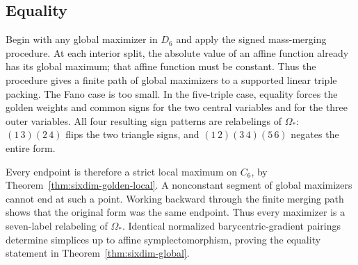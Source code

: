 \subsection{Equality}

Begin with any global maximizer in $D_6$ and apply the signed mass-merging
procedure. At each interior split, the absolute value of an affine function
already has its global maximum; that affine function must be constant.
Thus the procedure gives a finite path of global maximizers to a supported
linear triple packing. The Fano case is too small. In the five-triple case,
equality forces the golden weights and common signs for the two central
variables and for the three outer variables. All four resulting sign
patterns are relabelings of $\Omega_*$: $(1\,3)(2\,4)$ flips the two
triangle signs, and $(1\,2)(3\,4)(5\,6)$ negates the entire form.

Every endpoint is therefore a strict local maximum on $C_6$, by
Theorem~\ref{thm:sixdim-golden-local}. A nonconstant segment of global
maximizers cannot end at such a point. Working backward through the finite
merging path shows that the original form was the same endpoint. Thus every
maximizer is a seven-label relabeling of $\Omega_*$. Identical normalized
barycentric-gradient pairings determine simplices up to affine
symplectomorphism, proving the equality statement in
Theorem~\ref{thm:sixdim-global}.
